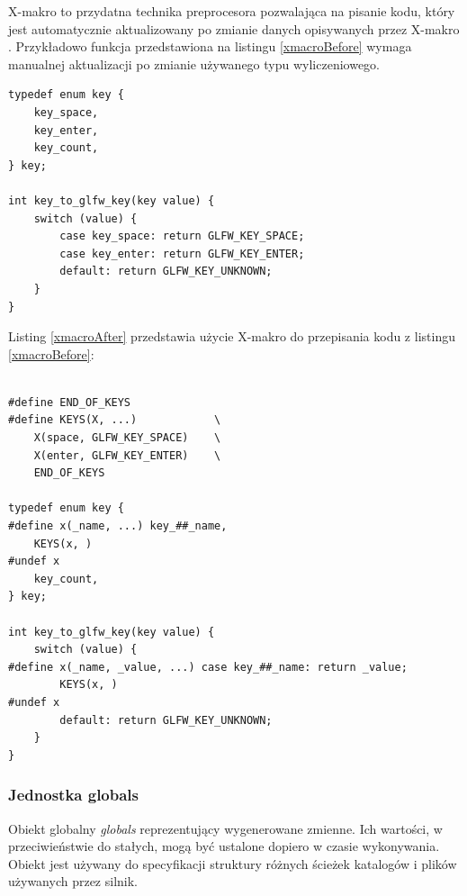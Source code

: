 X-makro to przydatna technika preprocesora pozwalająca na pisanie kodu, który jest automatycznie aktualizowany po zmianie danych opisywanych przez X-makro \cite{XMACRO}.
Przykładowo funkcja przedstawiona na listingu \ref{xmacroBefore} wymaga manualnej aktualizacji po zmianie używanego typu wyliczeniowego.
\lstset{language=C}
\begin{lstlisting}[caption={Przykładowy kod przed zastosowaniem X-makro},captionpos=b,label={xmacroBefore}]
typedef enum key {
	key_space,
	key_enter,
	key_count,
} key;

int key_to_glfw_key(key value) {
	switch (value) {
		case key_space: return GLFW_KEY_SPACE;
		case key_enter: return GLFW_KEY_ENTER;
		default: return GLFW_KEY_UNKNOWN;
	}
}
\end{lstlisting}
Listing \ref{xmacroAfter} przedstawia użycie X-makro do przepisania kodu z listingu \ref{xmacroBefore}:
\lstset{language=C}
\begin{lstlisting}[caption={Przykładowy kod po zastosowaniu X-makro},captionpos=b,label={xmacroAfter}]

#define END_OF_KEYS
#define KEYS(X, ...)			\
	X(space, GLFW_KEY_SPACE)	\
	X(enter, GLFW_KEY_ENTER)	\
	END_OF_KEYS

typedef enum key {
#define x(_name, ...) key_##_name,
	KEYS(x, )
#undef x
	key_count,
} key;

int key_to_glfw_key(key value) {
	switch (value) {
#define x(_name, _value, ...) case key_##_name: return _value;
		KEYS(x, )
#undef x
		default: return GLFW_KEY_UNKNOWN;
	}
}
\end{lstlisting}


\subsubsection{Jednostka globals}
Obiekt globalny \textit{globals} reprezentujący wygenerowane zmienne.
Ich wartości, w przeciwieństwie do stałych, mogą być ustalone dopiero w czasie wykonywania.
Obiekt jest używany do specyfikacji struktury różnych ścieżek katalogów i plików używanych przez silnik.

